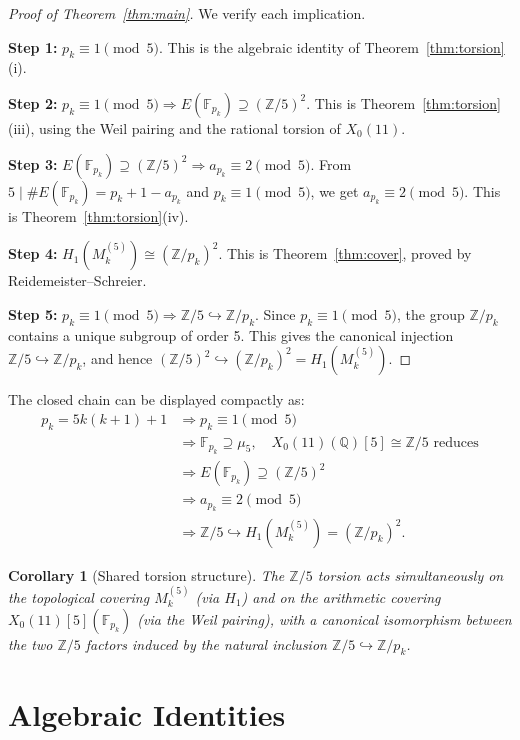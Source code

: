 \documentclass[11pt,a4paper]{article}
\newtheorem{corollary}[theorem]{Corollary}
\theoremstyle{definition}
\newcommand{\ZZ}{\mathbb{Z}}
\newcommand{\QQ}{\mathbb{Q}}
\newcommand{\FF}{\mathbb{F}}
\newcommand{\pk}{p_k}
\newcommand{\Xo}{X_0(11)}
\newcommand{\Ek}{E(\FF_{\pk})}
\begin{document}
\begin{proof}[Proof of Theorem~\ref{thm:main}]
We verify each implication.

\textbf{Step 1:} $\pk \equiv 1 \pmod{5}$.
This is the algebraic identity of Theorem~\ref{thm:torsion}(i).

\textbf{Step 2:} $\pk \equiv 1 \pmod{5}
\Rightarrow \Ek \supseteq (\ZZ/5)^2$.
This is Theorem~\ref{thm:torsion}(iii), using the Weil pairing
and the rational torsion of $\Xo$.

\textbf{Step 3:} $\Ek \supseteq (\ZZ/5)^2
\Rightarrow a_{\pk} \equiv 2 \pmod{5}$.
From $5 \mid \#\Ek = \pk + 1 - a_{\pk}$ and $\pk \equiv 1 \pmod{5}$,
we get $a_{\pk} \equiv 2 \pmod{5}$.
This is Theorem~\ref{thm:torsion}(iv).

\textbf{Step 4:} $H_1(M_k^{(5)}) \cong (\ZZ/\pk)^2$.
This is Theorem~\ref{thm:cover}, proved by Reidemeister--Schreier.

\textbf{Step 5:} $\pk \equiv 1 \pmod{5}
\Rightarrow \ZZ/5 \hookrightarrow \ZZ/\pk$.
Since $\pk \equiv 1 \pmod{5}$, the group $\ZZ/\pk$ contains
a unique subgroup of order 5. This gives the canonical injection
$\ZZ/5 \hookrightarrow \ZZ/\pk$, and hence
$(\ZZ/5)^2 \hookrightarrow (\ZZ/\pk)^2 = H_1(M_k^{(5)})$.
\end{proof}

The closed chain can be displayed compactly as:
\begin{align*}
  \pk = 5k(k+1)+1
  &\Rightarrow \pk \equiv 1 \pmod{5} \\
  &\Rightarrow \FF_{\pk} \supseteq \mu_5,\quad
     \Xo(\QQ)[5] \cong \ZZ/5 \text{ reduces} \\
  &\Rightarrow \Ek \supseteq (\ZZ/5)^2 \\
  &\Rightarrow a_{\pk} \equiv 2 \pmod{5} \\
  &\Rightarrow \ZZ/5 \hookrightarrow H_1(M_k^{(5)}) = (\ZZ/\pk)^2.
\end{align*}

\begin{corollary}[Shared torsion structure]
\label{cor:shared}
The $\ZZ/5$ torsion acts simultaneously on the topological
covering $M_k^{(5)}$ (via $H_1$) and on the arithmetic
covering $\Xo[5](\FF_{\pk})$ (via the Weil pairing),
with a canonical isomorphism between the two $\ZZ/5$ factors
induced by the natural inclusion $\ZZ/5 \hookrightarrow \ZZ/\pk$.
\end{corollary}

\section{Algebraic Identities}
\label{sec:identity}
\end{document}
